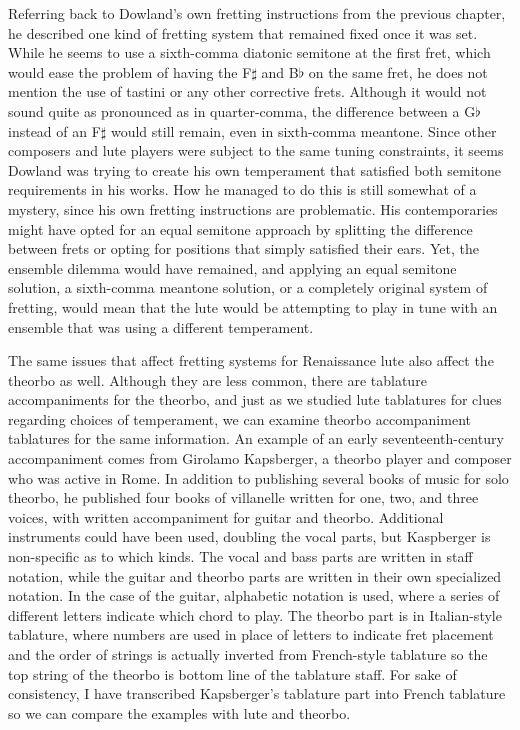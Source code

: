 Referring back to Dowland's own fretting instructions from the previous chapter,
he described one kind of fretting system that remained fixed once it was set.
While he seems to use a sixth-comma diatonic semitone at the first fret, which
would ease the problem of having the F$\sharp$ and B$\flat$ on the same fret, he
does not mention the use of tastini or any other corrective frets. Although it
would not sound quite as pronounced as in quarter-comma, the difference between a
G$\flat$ instead of an F$\sharp$ would still remain, even in sixth-comma
meantone. Since other composers and lute players were subject to the same tuning
constraints, it seems Dowland was trying to create his own temperament that
satisfied both semitone requirements in his works. How he managed to do this is
still somewhat of a mystery, since his own fretting instructions are
problematic. His contemporaries might have opted for an equal semitone approach
by splitting the difference between frets or opting for positions that simply
satisfied their ears. Yet, the ensemble dilemma would have remained, and
applying an equal semitone solution, a sixth-comma meantone solution, or a
completely original system of fretting, would mean that the lute would be
attempting to play in tune with an ensemble that was using a different
temperament.

The same issues that affect fretting systems for Renaissance lute also affect
the theorbo as well.  Although they are less common, there are tablature
accompaniments for the theorbo, and just as we studied lute tablatures for clues
regarding choices of temperament, we can examine theorbo accompaniment
tablatures for the same information. An example of an early seventeenth-century
accompaniment comes from Girolamo Kapsberger, a theorbo player and composer who
was active in Rome. In addition to publishing several books of music for solo
theorbo, he published four books of villanelle written for one, two, and
three voices, with written accompaniment for guitar and theorbo.  Additional
instruments could have been used, doubling the vocal parts, but Kaspberger is
non-specific as to which kinds.  The vocal and bass parts are written in
staff notation, while the guitar and theorbo parts are written in their own
specialized notation.  In the case of the guitar, alphabetic notation is used,
where a series of different letters indicate which chord to play. The theorbo
part is in Italian-style tablature, where numbers are used in place of letters
to indicate fret placement and the order of strings is actually inverted from
French-style tablature so the top string of the theorbo is bottom line of the
tablature staff.  For sake of consistency, I have transcribed Kapsberger's
tablature part into French tablature so we can compare the examples with lute
and theorbo.

